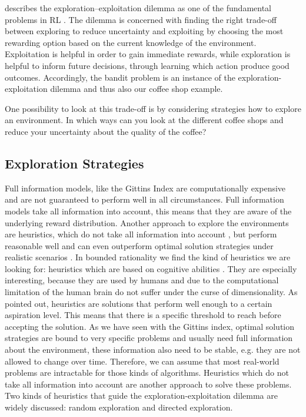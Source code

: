 \cite{kaelbling1996reinforcement} describes the exploration--exploitation dilemma as one of the fundamental problems in RL \citep{kaelbling1996reinforcement}.
The dilemma is concerned with finding the right trade-off between exploring to reduce uncertainty and exploiting by choosing the most rewarding option based on the current knowledge of the environment. Exploitation is helpful in order to gain immediate rewards, while exploration is helpful to inform future decisions, through learning which action produce good outcomes. 
Accordingly, the bandit problem is an instance of the exploration-exploitation dilemma and thus also our coffee shop example. 

One possibility to look at this trade-off is by considering strategies how to explore an environment. In which ways can you look at the different coffee shops and reduce your uncertainty about the quality of the coffee? 


\subsection{Exploration Strategies}
Full information models, like the Gittins Index are computationally expensive and are not guaranteed to perform well in all circumstances. Full information models take all information into account, this means that they are aware of the underlying reward distribution.
Another approach to explore the environments are heuristics, which do not take all information into account \citep{parpart2018heuristics}, but perform reasonable well and can even outperform optimal solution strategies under realistic scenarios \citep{gigerenzer1996reasoning, gigerenzer1999simple, katsikopoulos2010robust}.
In bounded rationality \citep{simon1956rational} we find the kind of heuristics we are looking for: heuristics which are based on cognitive abilities \citep{gigerenzer2002bounded}. They are especially interesting, because they are used by humans and due to the computational limitation of the human brain do not suffer under the curse of dimensionality.
As \cite{gigerenzer2009homo} pointed out, heuristics are solutions that perform well enough to a certain aspiration level. This means that there is a specific threshold to reach before accepting the solution. As we have seen with the Gittins index, optimal solution strategies are bound to very specific problems and usually need full information about the environment, these information also need to be stable, e.g. they are not allowed to change over time. Therefore, we can assume that most real-world problems are intractable for those kinds of algorithms. Heuristics which do not take all information into account are another approach to solve these problems. Two kinds of heuristics that guide the exploration-exploitation dilemma are widely discussed: random exploration and directed exploration.


